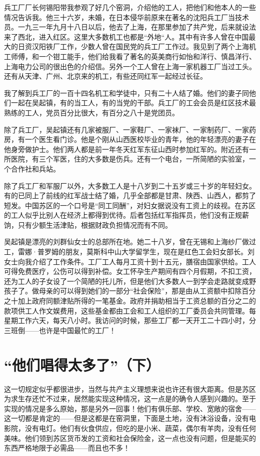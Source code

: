 \documentclass[10pt]{book}
\begin{document}
兵工厂厂长何锡阳带我参观了好几个窑洞，介绍他的工人，把他们和他本人的一些情况告诉我。他三十六岁，未婚，在日本侵华前原来在著名的沈阳兵工厂当技术员。一九三一年九月十八日以后，他去了上海，在那里参加了共产党，后来就设法来了西北，进入红区。这里大多数机工也都是“外地“人。其中有许多人曾在中国最大的日资汉阳铁厂工作，少数人曾在国民党的兵工厂工作过。我见到了两个上海机工师傅，和一个钳工能手，他们给我看了著名的英美商行如怡和洋行、慎昌洋行、上海电力公司的很出色的介绍信。另外一个工人曾在上海一家机器工厂当过工头。还有从天津、广州、北京来的机工，有些还同红军一起经过长征。

我了解到兵工厂的一百十四名机工和学徒中，只有二十人结了婚。他们的妻子同他们一起在吴起镇，有的当工人，有的当党的干部。兵工厂的工会会员是红区技术最熟练的工人，党员百分比很大，有百分之八十是党团员。

除了兵工厂，吴起镇还有几家被服厂、一家鞋厂、一家袜厂、一家制药厂、一家药房，有一个医生看门诊。他是个刚从山西医校毕业的青年，他的年轻漂亮的妻子在他身旁做护士。他们两人都是前一年冬天红军东征山西时参加红军的。附近还有一所医院，有三个军医，住的大多数是伤兵。还有一个电台，一所简陋的实验室，一个合作社和兵站。

除了兵工厂和军服厂以外，大多数工人是十八岁到二十五岁或三十岁的年轻妇女。有的已同上了前线的红军战士结了婚，几乎全部都是甘肃、陕西、山西人，都剪了短发。中国苏区的一个口号是“同工同酬”，对妇女据说没有工资上的歧视。在苏区的工人似乎比别人在经济上都得到优待。后者包括红军指挥员，他们没有正规薪饷，只有少额生活津贴，根据财政负担情况而有不同。

吴起镇是漂亮的刘群仙女士的总部所在地。她二十八岁，曾在无锡和上海纱厂做过工，雷娜·普罗姆的朋友，莫斯科中山大学留学生，现在是红色工会妇女部长。刘女士向我介绍了工作条件。工厂工人每月工资十到十五元，膳宿由国家供给。工人可得免费医疗，公伤可以得到补偿。女工怀孕生产期间有四个月假期，不扣工资，还为工人的子女设了一个简陋的托儿所，但是他们大多数人一到学会走路就变成野孩子了。做母亲的可以得到她们的一部分“社会保险”，那是由从工资额中扣除百分之十加上政府同额津贴所得的一笔基金。政府并捐助相当于工资总额的百分之二的款项供工人作文娱费用，这些基金都由工会和工人组织的工厂委员会共同管理。每星期工作六天，每天八小时。我访问的时候，那些工厂都一天开工二十四小时，分三班倒——也许是中国最忙的工厂！

\section{“他们唱得太多了”（下）}

这一切规定似乎都很进步，当然与共产主义理想来说也许还有很大距离。但是苏区为求生存还忙不过来，居然能实现这种情况，这一点是的确令人感到兴趣的。至于实现的情况是多么原始，那是另外一回事！他们有俱乐部、学校、宽敞的宿舍——这一切都是肯定的——但是这都是在窑洞里，下面是土地，没有沐浴设备，没有电影院，没有电灯。他们有伙食供应，但吃的是小米、蔬菜，偶尔有羊肉，没有任何美味。他们领到苏区货币发的工资和社会保险金，这一点也没有问题，但是能买的东西严格地限于必需品——而且也不多！
\end{document}
